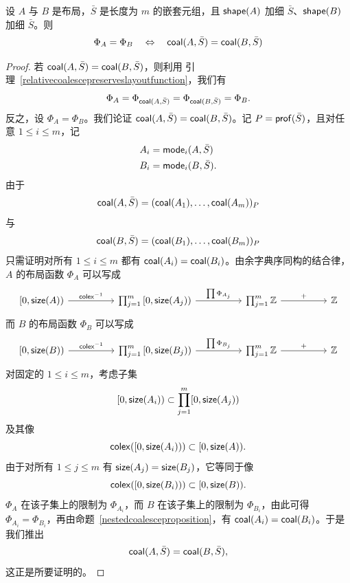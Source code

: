\begin{proposition}\label{relativecoalescedlayoutscharacterizedbylayoutfunction}
    设 $A$ 与 $B$ 是布局，$\bar{S}$ 是长度为 $m$ 的嵌套元组，且 $\mathsf{shape}(A)$ 加细 $\bar{S}$、$\mathsf{shape}(B)$ 加细 $\bar{S}$。则
    \[\Phi_A = \Phi_B \quad \Leftrightarrow \quad
    \mathsf{coal}(A,\bar{S}) = \mathsf{coal}(B,\bar{S})
    \]
\end{proposition}

\begin{proof}
    若 $\mathsf{coal}(A,\bar{S}) = \mathsf{coal}(B,\bar{S})$，则利用
    引理~\ref{relativecoalescepreserveslayoutfunction}，我们有
    \[
    \Phi_A = \Phi_{\mathsf{coal}(A,\bar{S})} = \Phi_{\mathsf{coal}(B,\bar{S})} = \Phi_B.
    \]
    反之，设 $\Phi_A = \Phi_B$。我们论证 $\mathsf{coal}(A,\bar{S}) = \mathsf{coal}(B,\bar{S})$。记 $P = \mathsf{prof}(\bar{S})$，且对任意 $1 \leq i \leq m$，记
    \begin{align*}
    A_i & = \mathsf{mode}_i(A,\bar{S})\\
    B_i & = \mathsf{mode}_i(B,\bar{S}).
    \end{align*}
    由于
    \[
    \mathsf{coal}(A,\bar{S}) =(\mathsf{coal}(A_1),\dots,\mathsf{coal}(A_m))_P
    \]
    与
    \[
    \mathsf{coal}(B,\bar{S}) = (\mathsf{coal}(B_1),\dots,\mathsf{coal}(B_m))_P
    \]
    只需证明对所有 $1 \leq i \leq m$ 都有 $\mathsf{coal}(A_i) = \mathsf{coal}(B_i)$。由余字典序同构的结合律，$A$ 的布局函数 $\Phi_A$ 可以写成
    \[
    \begin{tikzcd}
    {[}0,\size(A){)} \ar[rr,"\colex^{-1}"] & & \prod_{j=1}^m {[}0,\size(A_j) {)} \ar[rr,"\prod \Phi_{A_j}"] & & \prod_{j=1}^m \mathbb{Z} \ar[rr,"+"] & & \mathbb{Z}
    \end{tikzcd}
    \]
    而 $B$ 的布局函数 $\Phi_B$ 可以写成
    \[
    \begin{tikzcd}
    {[}0,\size(B){)} \ar[rr,"\colex^{-1}"] & & \prod_{j=1}^m {[}0,\size(B_j) {)} \ar[rr,"\prod \Phi_{B_j}"] & & \prod_{j=1}^m \mathbb{Z} \ar[rr,"+"] & & \mathbb{Z}
    \end{tikzcd}
    \]
    对固定的 $1 \leq i \leq m$，考虑子集
    \[
    [0,\mathsf{size}(A_i)) \subset \prod_{j=1}^m [0,\mathsf{size}(A_j))
    \]
    及其像
    \[
    \mathsf{colex}([0,\mathsf{size}(A_i))) \subset [0,\mathsf{size}(A)).
    \]
    由于对所有 $1 \leq j \leq m$ 有 $\mathsf{size}(A_j) = \mathsf{size}(B_j)$，它等同于像
    \[
    \mathsf{colex}([0,\mathsf{size}(B_i))) \subset [0,\mathsf{size}(B)).
    \]
    $\Phi_A$ 在该子集上的限制为 $\Phi_{A_i}$，而 $B$ 在该子集上的限制为 $\Phi_{B_i}$，由此可得 $\Phi_{A_i} = \Phi_{B_i}$，再由命题~\ref{nestedcoalesceproposition}，有 $\mathsf{coal}(A_i) = \mathsf{coal}(B_i)$。于是我们推出
    \[
    \mathsf{coal}(A,\bar{S}) = \mathsf{coal}(B,\bar{S}),
    \]
    这正是所要证明的。
\end{proof}


